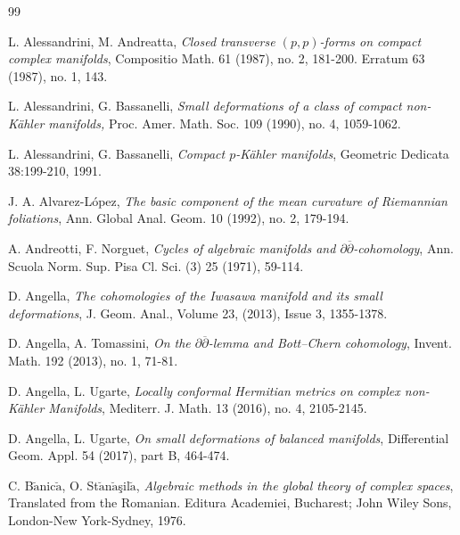 \documentclass[12pt]{amsart}
\numberwithin{equation}{section}
\theoremstyle{definition}
\theoremstyle{definition}
\theoremstyle{definition}
\renewcommand{\1}{\mathsf{1}}
\renewcommand{\>}{\rightarrow}
\newcommand{\p}{\partial}
\newcommand{\bp}{\overline\partial}
\def\p{\partial}
\theoremstyle{plain} %
\theoremstyle{plain} %
\theoremstyle{plain} %
\begin{document}
	\begin{thebibliography}{99} 			
		
		
		 L. Alessandrini, M. Andreatta,
		\newblock \textit{Closed transverse $(p,p)$-forms on compact complex
			manifolds},
		\newblock  Compositio Math. 61 (1987), no. 2, 181-200. Erratum 63
		(1987), no. 1, 143.
		
		 L. Alessandrini, G. Bassanelli,
		\newblock \textit{Small deformations
			of a class of compact non-K\"ahler manifolds,}
		\newblock Proc. Amer. Math. Soc. 109 (1990), no. 4, 1059-1062.
		
		 L. Alessandrini, G. Bassanelli,
		\newblock \textit{Compact $p$-K\"ahler manifolds},
		\newblock Geometric Dedicata {38}:199-210, 1991.
		
		
		
		 J. A. Alvarez-L\'opez,
		\newblock \textit{The basic component of the mean curvature of Riemannian foliations},
		\newblock Ann. Global Anal. Geom. 10 (1992), no. 2, 179-194.
		
		 A. Andreotti, F.  Norguet,
		\newblock\textit{Cycles of algebraic manifolds and $\p\bp$-cohomology},
		\newblock Ann. Scuola Norm. Sup. Pisa Cl. Sci. (3) 25 (1971), 59-114.
		
		 D. Angella,
		\newblock \textit{The cohomologies of the Iwasawa manifold and its small
			deformations}, J. Geom. Anal., Volume 23, (2013), Issue 3,
		1355-1378.
		
		 D. Angella, A. Tomassini,
		\newblock \textit{On the
			$\partial\overline{\partial}$-lemma and Bott--Chern cohomology},
		\newblock Invent. Math. 192 (2013), no. 1, 71-81.
		
		 D. Angella, L. Ugarte,
		\newblock \textit{Locally conformal Hermitian metrics on complex non-K\"ahler Manifolds},
		\newblock Mediterr. J. Math. {13} (2016), no. 4, 2105-2145.
		
		 D. Angella, L. Ugarte,
		\newblock \textit{On small deformations of balanced manifolds},
		\newblock Differential Geom. Appl. 54 (2017), part B, 464-474.
		
		
		
		 C. B$\breve{\textrm{a}}$nic$\breve{\textrm{a}}$, O. St$\breve{\textrm{a}}$n$\breve{\textrm{a}}$\c{s}il$\breve{\textrm{a}}$,
		\textit{Algebraic methods in the global theory of complex spaces}, Translated from the Romanian. Editura Academiei, Bucharest; John Wiley  Sons, London-New York-Sydney, 1976.
		

\end{thebibliography}
\end{document}
